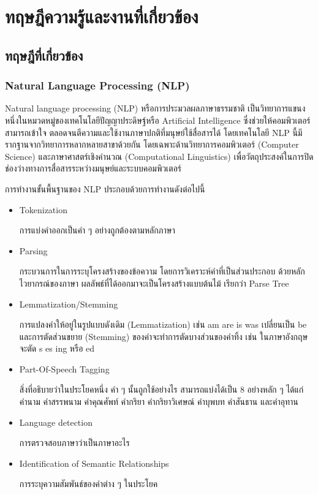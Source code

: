 \documentclass[12pt,oneside,openright,a4paper]{cpe-thai-project}
\begin{document}

\chapter{ทฤษฎีความรู้และงานที่เกี่ยวข้อง}

\section{ทฤษฎีที่เกี่ยวข้อง}
  \subsection{Natural Language Processing (NLP)}
    \hspace{1cm}Natural language processing (NLP) หรือการประมวลผลภาษาธรรมชาติ เป็นวิทยาการแขนงหนึ่งในหมวดหมู่ของเทคโนโลยีปัญญาประดิษฐ์หรือ Artificial Intelligence 
    ซึ่งช่วยให้คอมพิวเตอร์สามารถเข้าใจ ตลอดจนตีความและใช้งานภาษาปกติที่มนุษย์ใช้สื่อสารได้ โดยเทคโนโลยี NLP นี้มีรากฐานจากวิทยาการหลากหลายสาขาด้วยกัน 
    โดยเฉพาะด้านวิทยาการคอมพิวเตอร์ (Computer Science) และภาษาศาสตร์เชิงคำนวณ (Computational Linguistics) 
    เพื่อวัตถุประสงค์ในการปิดช่องว่างทางการสื่อสารระหว่างมนุษย์และระบบคอมพิวเตอร์ \cite{nlp} 

    การทํางานขั้นพื้นฐานของ NLP ประกอบด้วยการทํางานดังต่อไปนี้ 
    \begin{itemize}
      \item Tokenization 
      
            การแบ่งคําออกเป็นคํา ๆ อย่างถูกต้องตามหลักภาษา
      \item Parsing 
      
            กระบวนการในการระบุโครงสร้างของข้อความ โดยการวิเคราะห์คําที่เป็นส่วนประกอบ 
            ด้วยหลักไวยากรณ์ของภาษา ผลลัพธ์ที่ได้ออกมาจะเป็นโครงสร้างแบบต้นไม้ เรียกว่า Parse Tree
      \item Lemmatization/Stemming 
      
            การแปลงคําให้อยู่ในรูปแบบดังเดิม (Lemmatization) เช่น am are is was เปลี่ยนเป็น be และการตัดส่วนขยาย (Stemming) 
            ของคําจะทําการตัดบางส่วนของคําทิ้ง เช่น ในภาษาอังกฤษ จะตัด s es ing หรือ ed
      \item Part-Of-Speech Tagging 
      
            สิ่งที่อธิบายว่าในประโยคหนึ่ง คํา ๆ นั้นถูกใช้อย่างไร สามารถแบ่งได้เป็น 8 อย่างหลัก ๆ ได้แก่ คํานาม คําสรรพนาม  
            คําคุณศัพท์ คํากริยา คํากริยาวิเศษณ์ คําบุพบท คําสันธาน และคําอุทาน 
      \item Language detection 
      
            การตรวจสอบภาษาว่าเป็นภาษาอะไร
      \item Identification of Semantic Relationships 
      
            การระบุความสัมพันธ์ของคําต่าง ๆ ในประโยค
    \end{itemize}
\end{document}
